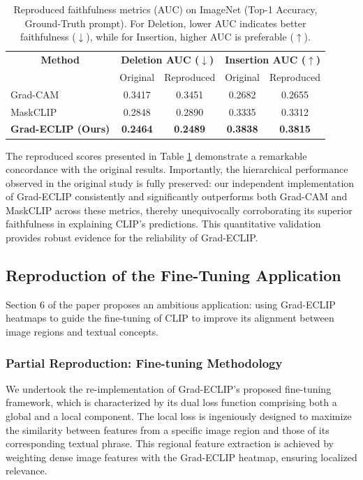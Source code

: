 \documentclass[10pt]{article} %
\begin{document}
\begin{table}[t]
\caption{Reproduced faithfulness metrics (AUC) on ImageNet (Top-1 Accuracy, Ground-Truth prompt). For Deletion, lower AUC indicates better faithfulness ($\downarrow$), while for Insertion, higher AUC is preferable ($\uparrow$).}
\label{table:quantitative-repro}
\begin{center}
\begin{tabular}{lcccc}
\toprule
\multicolumn{1}{c}{\bf Method} & \multicolumn{2}{c}{\bf Deletion AUC ($\downarrow$)} & \multicolumn{2}{c}{\bf Insertion AUC ($\uparrow$)} \\
& Original & Reproduced & Original & Reproduced \\
\midrule
Grad-CAM & 0.3417 & 0.3451 & 0.2682 & 0.2655 \\
MaskCLIP & 0.2848 & 0.2890 & 0.3335 & 0.3312 \\
\textbf{Grad-ECLIP (Ours)} & \textbf{0.2464} & \textbf{0.2489} & \textbf{0.3838} & \textbf{0.3815} \\
\bottomrule
\end{tabular}
\end{center}
\end{table}

The reproduced scores presented in Table \ref{table:quantitative-repro} demonstrate a remarkable concordance with the original results. Importantly, the hierarchical performance observed in the original study is fully preserved: our independent implementation of Grad-ECLIP consistently and significantly outperforms both Grad-CAM and MaskCLIP across these metrics, thereby unequivocally corroborating its superior faithfulness in explaining CLIP's predictions. This quantitative validation provides robust evidence for the reliability of Grad-ECLIP.

\subsection{Reproduction of the Fine-Tuning Application}

Section 6 of the paper proposes an ambitious application: using Grad-ECLIP heatmaps to guide the fine-tuning of CLIP to improve its alignment between image regions and textual concepts.

\subsubsection{Partial Reproduction: Fine-tuning Methodology}

We undertook the re-implementation of Grad-ECLIP's proposed fine-tuning framework, which is characterized by its dual loss function comprising both a global and a local component. The local loss is ingeniously designed to maximize the similarity between features from a specific image region and those of its corresponding textual phrase. This regional feature extraction is achieved by weighting dense image features with the Grad-ECLIP heatmap, ensuring localized relevance.
\end{document}
